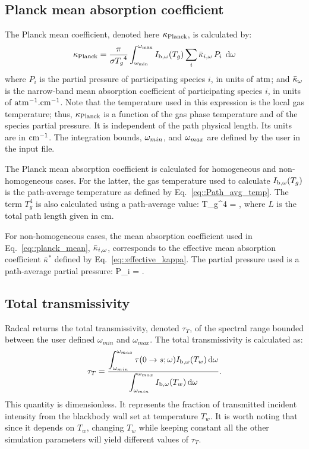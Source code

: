 \subsection{Planck mean absorption coefficient}
The Planck mean coefficient, denoted here $\kappa_{\rm Planck}$, is calculated by:
\begin{equation}\label{eq::planck_mean}
\kappa_{\rm Planck} = \dfrac{\pi}{\sigma {T_g}^4}
\displaystyle\int_{\omega_{\min}}^{\omega_{\max}}{I_{\rm b,\omega}(T_g)
\displaystyle\sum_i \bar{\kappa}_{i,\omega} \, P_i \; \,\mathrm{d} \omega}
\end{equation}
where $P_i$ is the partial pressure of participating species $i$, in units of ${\rm atm}$; and $\bar{\kappa}_{\omega}$ is the narrow-band mean absorption coefficient of participating species $i$, in units of ${\rm atm^{-1}.cm^{-1}}$. Note that the temperature used in this expression is the local gas temperature; thus, $\kappa_{\rm Planck}$ is a function of the gas phase temperature and of the species partial pressure. It is independent of the path physical length. Its units are in ${\rm cm^{-1}}$. The integration bounds, $\omega_{min}$, and $\omega_{max}$ are defined by the user in the input file.

The Planck mean absorption coefficient is calculated for homogeneous and non-homogeneous cases. For the latter, the gas temperature used to calculate $I_{\rm b,\omega}(T_g)$ is the path-average temperature as defined by Eq.~\ref{eq::Path_avg_temp}. The term $T_g^4$ is also calculated using a path-average value:
\be
T_g^4 = ,
\ee
where $L$ is the total path length given in cm.

For non-homogeneous cases, the mean absorption coefficient used in Eq.~\ref{eq::planck_mean}, $\bar{\kappa}_{i,\omega}$, corresponds to the effective mean absorption coefficient $\bar{\kappa}^*$ defined by Eq.~\ref{eq::effective_kappa}. The partial pressure used is a path-average partial pressure:
\be
P_i = .
\ee

\subsection{Total transmissivity}

Radcal returns the total transmissivity, denoted $\tau_{T}$, of the spectral range bounded between the user defined $\omega_{min}$ and $\omega_{max}$. The total transmissivity is calculated as:
\begin{equation}\label{eq::total_transmissivity}
 \tau_{T} = \dfrac{\displaystyle\int_{\omega_{min}}^{\omega_{max}}\tau(0 \rightarrow s;\omega)I_{\rm b,\omega}(T_w) \,\mathrm{d} \omega }{\displaystyle\int_{\omega_{min}}^{\omega_{max}}I_{\rm b,\omega}(T_w)\,\mathrm{d} \omega }.
\end{equation}
This quantity is dimensionless. It represents the fraction of transmitted incident intensity from the blackbody wall set at temperature $T_w$. It is worth noting that since it depends on $T_w$, changing $T_w$ while keeping constant all the other simulation parameters will yield different values of $\tau_{T}$.

